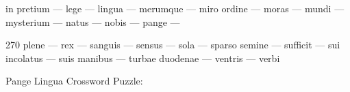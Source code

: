 \documentclass[12pt]{article}
\begin{document}
\pagestyle{fancy}
\fancyhf{}
\renewcommand{\headrulewidth}{0pt}
\renewcommand{\footrulewidth}{0pt}
\libertine
\renewcommand\PuzzleClueFont{\rm\normalsize}
\noindent\begin{rotate}{0}
\small \quad in pretium --- lege --- lingua --- merumque --- miro ordine --- moras --- mundi --- mysterium --- natus --- nobis --- pange ---
\end{rotate}
\hfill
\begin{rotate}{270}
\small  plene --- rex --- sanguis --- sensus --- sola --- sparso semine --- sufficit --- sui incolatus --- suis manibus --- turbae duodenae --- ventris --- verbi
\end{rotate}
\begin{center}
  \huge{Pange Lingua Crossword Puzzle:}
\end{center}
\vspace{1.5cm}
\end{document}
